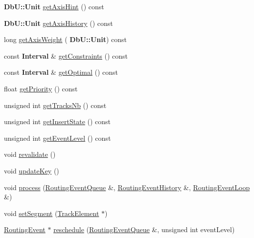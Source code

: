 \begin{DoxyCompactItemize}
\item 
\textbf{ Db\+U\+::\+Unit} \hyperlink{classKite_1_1RoutingEvent_ab94e1b7e323c5344019d6ea545e3ea05}{get\+Axis\+Hint} () const
\item 
\textbf{ Db\+U\+::\+Unit} \hyperlink{classKite_1_1RoutingEvent_ad1c8d7db376d2e0b99eb1f54df29dc71}{get\+Axis\+History} () const
\item 
long \hyperlink{classKite_1_1RoutingEvent_aef5716e4b434aae813b1067a908f8b1a}{get\+Axis\+Weight} (\textbf{ Db\+U\+::\+Unit}) const
\item 
const \textbf{ Interval} \& \hyperlink{classKite_1_1RoutingEvent_a1bea8aed79a2ac4c726e49b93af3cd37}{get\+Constraints} () const
\item 
const \textbf{ Interval} \& \hyperlink{classKite_1_1RoutingEvent_a7dc0bafe113b8ec0c143ae4644ac79d4}{get\+Optimal} () const
\item 
float \hyperlink{classKite_1_1RoutingEvent_a391dd4b2a826c1d4713ef24ba25f687a}{get\+Priority} () const
\item 
unsigned int \hyperlink{classKite_1_1RoutingEvent_acd1128e75a441b654e6d881c495db4f7}{get\+Tracks\+Nb} () const
\item 
unsigned int \hyperlink{classKite_1_1RoutingEvent_a00f02910915e7deb857f023e5d584c08}{get\+Insert\+State} () const
\item 
unsigned int \hyperlink{classKite_1_1RoutingEvent_aebcd2884d8fa70256b0041b29e14404d}{get\+Event\+Level} () const
\item 
void \hyperlink{classKite_1_1RoutingEvent_a5bd93abe1416952ace15a98dbeeed124}{revalidate} ()
\item 
void \hyperlink{classKite_1_1RoutingEvent_a14468bece068cbc5221f057226ee8955}{update\+Key} ()
\item 
void \hyperlink{classKite_1_1RoutingEvent_a6add4f520081c698421481bf8fe0ad1f}{process} (\hyperlink{classKite_1_1RoutingEventQueue}{Routing\+Event\+Queue} \&, \hyperlink{classKite_1_1RoutingEventHistory}{Routing\+Event\+History} \&, \hyperlink{classKite_1_1RoutingEventLoop}{Routing\+Event\+Loop} \&)
\item 
void \hyperlink{classKite_1_1RoutingEvent_ae2eddb4497661b6319616a70c4acd165}{set\+Segment} (\hyperlink{classKite_1_1TrackElement}{Track\+Element} $\ast$)
\item 
\hyperlink{classKite_1_1RoutingEvent}{Routing\+Event} $\ast$ \hyperlink{classKite_1_1RoutingEvent_abf2d02f18f96183fc6e78f3e6dc8cbf6}{reschedule} (\hyperlink{classKite_1_1RoutingEventQueue}{Routing\+Event\+Queue} \&, unsigned int event\+Level)

\end{DoxyCompactItemize}
